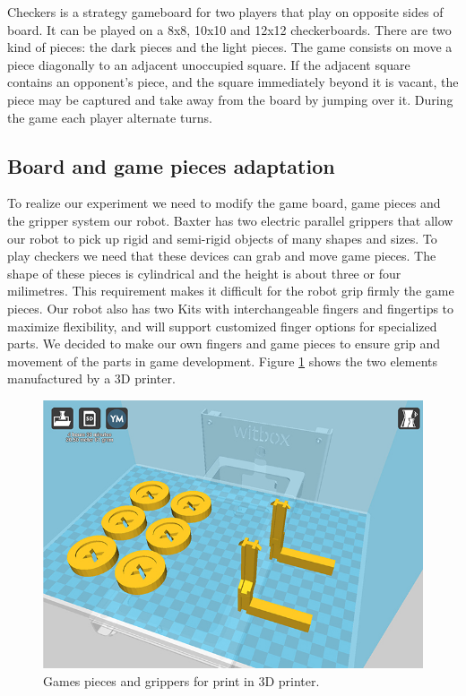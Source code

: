 \documentclass[journal,twoside]{JoPhA}
\begin{document}
Checkers is a strategy gameboard for two players that play on opposite sides of board. It can be played on a 8x8, 10x10 and 12x12 checkerboards.
There are two kind of pieces: the dark pieces and the light pieces. 
The game consists on move a piece diagonally to an adjacent unoccupied square. If the adjacent square contains an opponent's piece, and the square immediately beyond it is vacant, the piece may be captured and take away from the board by jumping over it. During the game each player alternate turns.

\subsection{Board and game pieces adaptation}

To realize our experiment we need to modify the game board, game pieces and the gripper system our robot.
Baxter has two electric parallel grippers that allow our robot to pick up rigid and semi-rigid objects of many shapes and sizes. To play checkers we need that these devices can grab and move game pieces. The shape of these pieces is cylindrical and the height is about three or four milimetres. This requirement makes it difficult for the robot grip firmly the game pieces. Our robot also has two Kits with interchangeable fingers and fingertips to maximize flexibility, and will support customized finger options for specialized parts. We decided to make our own fingers and game pieces to ensure grip and movement of the parts in game development. Figure \ref{3Dprinter} shows the two elements manufactured by a 3D printer.

\begin{figure}[h]
\centering
\includegraphics[scale=0.35]{Images/print_3D_2.jpg} 
\caption{\label{3Dprinter}Games pieces and grippers for print in 3D printer.}
\end{figure}
\end{document}
